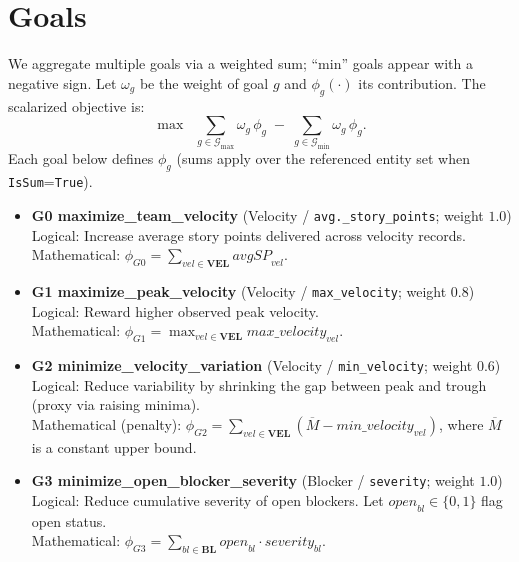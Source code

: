 \documentclass[11pt,a4paper]{article}
\begin{document}
\section{Goals}
We aggregate multiple goals via a weighted sum; ``min'' goals appear with a negative sign. Let $\omega_g$ be the weight of goal $g$ and $\phi_g(\cdot)$ its contribution. The scalarized objective is:
\[
\max \;\; \sum_{g \in \mathcal{G}_{\max}} \omega_g \, \phi_g \;-\; \sum_{g \in \mathcal{G}_{\min}} \omega_g \, \phi_g.
\]
Each goal below defines $\phi_g$ (sums apply over the referenced entity set when \texttt{IsSum}=\texttt{True}).

\begin{itemize}[leftmargin=2em,itemsep=0.5em]
  \item \textbf{G0 maximize\_team\_velocity} (Velocity / \texttt{avg.\_story\_points}; weight $1.0$)\\
  Logical: Increase average story points delivered across velocity records.\\
  Mathematical: $\displaystyle \phi_{G0} = \sum_{vel \in \mathbf{VEL}} \textit{avgSP}_{vel}$.

  \item \textbf{G1 maximize\_peak\_velocity} (Velocity / \texttt{max\_velocity}; weight $0.8$)\\
  Logical: Reward higher observed peak velocity.\\
  Mathematical: $\displaystyle \phi_{G1} = \max_{vel \in \mathbf{VEL}} \textit{max\_velocity}_{vel}$.

  \item \textbf{G2 minimize\_velocity\_variation} (Velocity / \texttt{min\_velocity}; weight $0.6$)\\
  Logical: Reduce variability by shrinking the gap between peak and trough (proxy via raising minima).\\
  Mathematical (penalty): $\displaystyle \phi_{G2} = \sum_{vel \in \mathbf{VEL}} \left(\overline{M}-\textit{min\_velocity}_{vel}\right)$, where $\overline{M}$ is a constant upper bound.

  \item \textbf{G3 minimize\_open\_blocker\_severity} (Blocker / \texttt{severity}; weight $1.0$)\\
  Logical: Reduce cumulative severity of open blockers. Let $\textit{open}_{bl}\in\{0,1\}$ flag open status.\\
  Mathematical: $\displaystyle \phi_{G3} = \sum_{bl \in \mathbf{BL}} \textit{open}_{bl}\cdot \textit{severity}_{bl}$.


\end{itemize}
\end{document}
